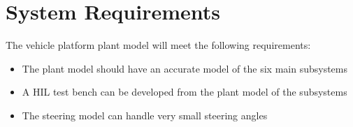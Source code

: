 \documentclass[letterpaper,12pt]{article}   %
\begin{document}


\section{System Requirements}
The vehicle platform plant model will meet the following requirements:
\begin{itemize}
    \item The plant model should have an accurate model of the six main subsystems
    \item A HIL test bench can be developed from the plant model of the subsystems
    \item The steering model can handle very small steering angles
\end{itemize}
\end{document}
